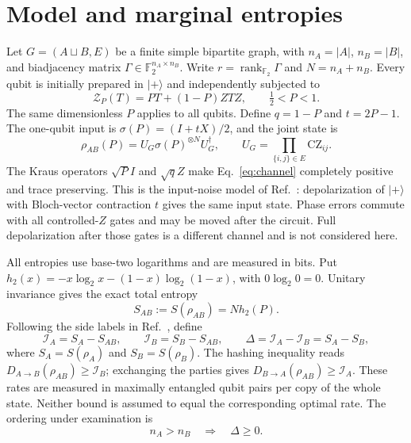 \documentclass[11pt,a4paper]{article}
\newcommand{\F}{\mathbb F_2}
\newcommand{\IA}{\mathcal I_A}
\newcommand{\IB}{\mathcal I_B}
\newcommand{\rank}{\operatorname{rank}}
\newcommand{\CZ}{\mathrm{CZ}}
\begin{document}
\section{Model and marginal entropies}\label{sec:model}

Let $G=(A\sqcup B,E)$ be a finite simple bipartite graph, with $n_A=|A|$,
$n_B=|B|$, and biadjacency matrix $\Gamma\in\F^{n_A\times n_B}$.
Write $r=\rank_{\F}\Gamma$ and $N=n_A+n_B$. Every qubit is initially prepared
in $|+\rangle$ and independently subjected to
\begin{equation}
 \mathcal Z_P(T)=PT+(1-P)ZTZ,\qquad \tfrac12<P<1.
 \label{eq:channel}
\end{equation}
The same dimensionless $P$ applies to all qubits. Define $q=1-P$ and $t=2P-1$.
The one-qubit input is $\sigma(P)=(I+tX)/2$, and the joint state is
\begin{equation}
 \rho_{AB}(P)=U_G\sigma(P)^{\otimes N}U_G^\dagger,
 \qquad U_G=\prod_{\{i,j\}\in E}\CZ_{ij}.
 \label{eq:state}
\end{equation}
The Kraus operators $\sqrt P I$ and $\sqrt q Z$ make
Eq.~\eqref{eq:channel} completely positive and trace preserving. This is the
input-noise model of Ref.~\cite[Sec.~2.2]{Sajjad2026lowerbounds}:
depolarization of $|+\rangle$ with Bloch-vector contraction $t$ gives the same
input state. Phase errors commute with all controlled-$Z$ gates and may be moved
after the circuit. Full depolarization after those gates is a different channel
and is not considered here.

All entropies use base-two logarithms and are measured in bits. Put
$h_2(x)=-x\log_2x-(1-x)\log_2(1-x)$, with $0\log_2 0=0$.
Unitary invariance gives the exact total entropy
\begin{equation}
 S_{AB}:=S(\rho_{AB})=N h_2(P).
 \label{eq:total}
\end{equation}
Following the side labels in Ref.~\cite[Sec.~2.3]{Sajjad2026lowerbounds}, define
\begin{equation}
 \IA=S_A-S_{AB},\qquad \IB=S_B-S_{AB},\qquad
 \Delta=\IA-\IB=S_A-S_B,
 \label{eq:direction}
\end{equation}
where $S_A=S(\rho_A)$ and $S_B=S(\rho_B)$. The hashing inequality
\cite[Theorem~10 in the author preprint]{DevetakWinter2005} reads
$D_{A\to B}(\rho_{AB})\geq\IB$; exchanging the parties gives
$D_{B\to A}(\rho_{AB})\geq\IA$. These rates are measured in maximally
entangled qubit pairs per copy of the whole state. Neither bound is assumed to
equal the corresponding optimal rate. The ordering under examination is
\begin{equation}
 n_A>n_B\quad\Longrightarrow\quad\Delta\geq0.
 \label{eq:conjecture}
\end{equation}
\end{document}
